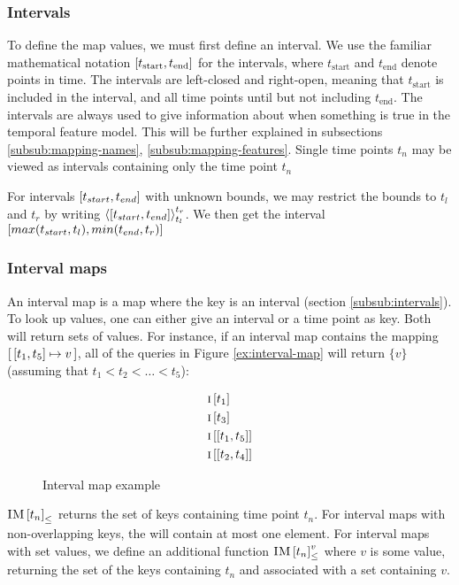 \subsubsection{Intervals}
\label{subsub:intervals}
To define the map values, we must first define an interval. We use the familiar mathematical notation $\interval{t_\text{start}}{t_\text{end}}$ for the intervals, where $t_\text{start}$ and $t_\text{end}$ denote points in time. The intervals are left-closed and right-open, meaning that $t_\text{start}$ is included in the interval, and all time points until but not including $t_\text{end}$. The intervals are always used to give information about when something is true in the temporal feature model. This will be further explained in subsections \ref{subsub:mapping-names}, \ref{subsub:mapping-features}. Single time points $t_n$ may be viewed as intervals containing only the time point $t_n$

For intervals $\interval{t_{start}}{t_{end}}$ with unknown bounds, we may restrict the bounds to $t_l$ and $t_r$ by writing $\clamp{\interval{t_{start}}{t_{end}}}{t_l}{t_r}$. We then get the interval $\interval{max(t_{start}, t_l)}{min(t_{end}, t_r)}$

\subsubsection{Interval maps}
\label{subsub:interval-maps}
An interval map is a map where the key is an interval (section \vref{subsub:intervals}). To look up values, one can either give an interval or a time point as key. Both will return sets of values. For instance, if an interval map  contains the mapping $\intervalmapping{t_1}{t_5}{v}$, all of the queries in Figure \vref{ex:interval-map} will return $\{v\}$ (assuming that $t_1 < t_2 < \ldots < t_5$):

\begin{figure}[h]
  \begin{align*}
    & \lookup{\map{i}}{t_1} \\
    & \lookup{\map{i}}{t_3} \\
    & \lookup{\map{i}}{\interval{t_1}{t_5}} \\
    & \lookup{\map{i}}{\interval{t_2}{t_4}}
  \end{align*}
  \caption{Interval map example}
  \label{ex:interval-map}
\end{figure}

${\textsc{IM} \left[ t_n \right]}_{\leq}$ returns the set of keys containing time point $t_n$. For interval maps with non-overlapping keys, the will contain at most one element. For interval maps with set values, we define an additional function ${\textsc{IM} \left[ t_n \right]^{v}_{\leq}}$ where $v$ is some value, returning the set of the keys containing $t_n$ and associated with a set containing $v$. 

